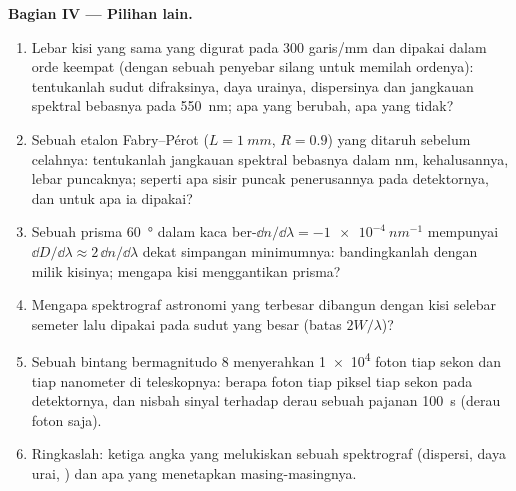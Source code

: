 \begin{problem}
\medskip
\noindent\textbf{Bagian IV --- Pilihan lain.}
\begin{enumerate}[resume]
  \item Lebar kisi yang sama yang digurat pada $300$ garis/mm dan dipakai dalam
        orde keempat (dengan sebuah penyebar silang untuk memilah ordenya):
        tentukanlah sudut difraksinya, daya urainya, dispersinya dan jangkauan
        spektral bebasnya pada \qty{550}{nm}; apa yang berubah, apa yang tidak?
  \item Sebuah etalon Fabry--Pérot ($L = \qty{1}{mm}$, $R = 0.9$) yang ditaruh sebelum
        celahnya: tentukanlah jangkauan spektral bebasnya dalam nm, kehalusannya, lebar puncaknya; seperti apa
        sisir puncak penerusannya pada detektornya,
        dan untuk apa ia dipakai?
  \item Sebuah prisma \qty{60}{\degree} dalam kaca ber-$\dd n/\dd\lambda = \qty{-1e-4}{nm^{-1}}$
        mempunyai  $\dd D/\dd\lambda \approx 2\,\dd n/\dd\lambda$ dekat
        simpangan minimumnya: bandingkanlah dengan milik kisinya; mengapa kisi
        menggantikan prisma?
  \item Mengapa spektrograf astronomi yang terbesar dibangun dengan
        kisi selebar semeter lalu dipakai pada sudut yang besar (batas
        $2W/\lambda$)?
  \item Sebuah bintang bermagnitudo 8 menyerahkan \qty{1e4}{} foton tiap sekon dan
        tiap nanometer di teleskopnya: berapa foton tiap piksel tiap sekon
        pada detektornya, dan nisbah sinyal terhadap derau sebuah pajanan
        \qty{100}{s} (derau foton saja).
  \item Ringkaslah: ketiga angka yang melukiskan sebuah spektrograf
        (dispersi, daya urai, ) dan apa yang
        menetapkan masing-masingnya.
\end{enumerate}
\end{problem}
